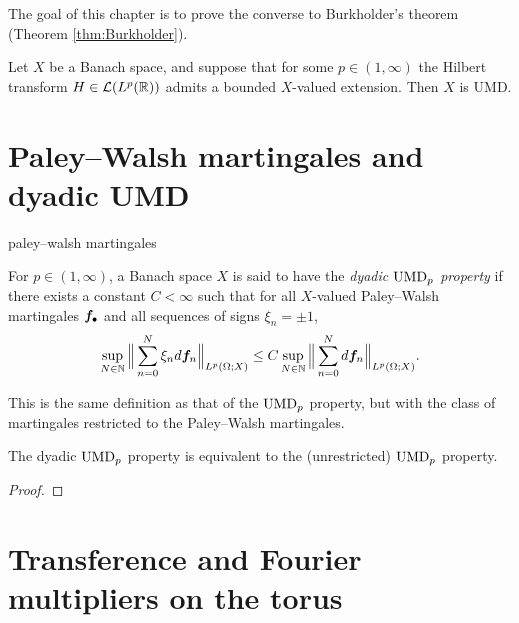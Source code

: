 The goal of this chapter is to prove the converse to Burkholder's theorem (Theorem \ref{thm:Burkholder}).

\begin{thm}[Bourgain]\label{thm:Bourgain}
  Let $X$ be a Banach space, and suppose that for some $p \in (1,\infty)$ the Hilbert transform $H \in \mathcal{L}(L^p(\mathbb{R}))$ admits a bounded $X$-valued extension.
  Then $X$ is UMD.
\end{thm}





\section{Paley--Walsh martingales and dyadic UMD}

\begin{defn}
  paley--walsh martingales
\end{defn}

\begin{defn}
  For $p \in (1,\infty)$, a Banach space $X$ is said to have the \emph{dyadic $\mathrm{UMD}_{p}$ property} if there exists a constant $C < \infty$ such that for all $X$-valued Paley--Walsh martingales $\bm{f}_{\bullet}$ and all sequences of signs $\xi_n = \pm 1$,
  \begin{equation}\label{eq:dyadic-UMD-property}
    \sup_{N \in \mathbb{N}} \Big\| \sum_{n=0}^{N} \xi_{n} d\bm{f}_{n} \Big\|_{L^p(\Omega;X)} \leq C \sup_{N \in \mathbb{N}} \Big\| \sum_{n=0}^{N} d\bm{f}_{n}\Big\|_{L^p(\Omega;X)}.
  \end{equation}
\end{defn}

This is the same definition as that of the $\mathrm{UMD}_{p}$ property, but with the class of martingales restricted to the Paley--Walsh martingales.

\begin{thm}\label{thm:dyadic-UMD}
  The dyadic $\mathrm{UMD}_{p}$ property is equivalent to the (unrestricted) $\mathrm{UMD}_{p}$ property.
\end{thm}

\begin{proof}
  
\end{proof}

\section{Transference and Fourier multipliers on the torus}

